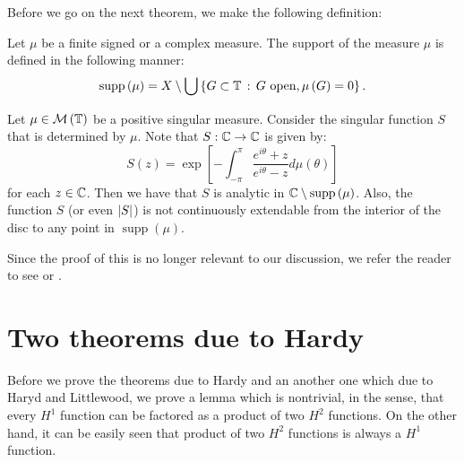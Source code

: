 Before we go on the next theorem, we make the following definition:
\begin{definition}
    Let $\mu$ be a finite signed or a complex measure. The support of the measure $\mu$ is defined in the following manner:
    \begin{equation*}
	\operatorname{supp} \left( \mu \right) = X \setminus \bigcup \left\{ G \subset \mathbb T \, : \, G \text{ open}, \mu \left( G \right) = 0 \right\}.
    \end{equation*}
    \label{def:support-of-a-measure}
\end{definition}

\begin{theorem}
    Let $\mu \in {\cal M} \left( \mathbb T \right)$ be a positive singular measure. Consider the singular function $S$ that is determined by $\mu$. Note that $S : \mathbb C \to \mathbb C$ is given by:
    \begin{equation*}
	S\left( z \right) = \exp \left[ -\int_{-\pi}^{\pi} \frac{e^{i\theta} + z}{e^{i\theta} - z} d\mu \left( \theta \right) \right]
    \end{equation*}
    for each $z\in \mathbb C$. Then we have that $S$ is analytic in $\mathbb C \setminus \operatorname{supp} \left( \mu \right)$. Also, the function $S$ (or even $\left\lvert S \right\rvert$) is not continuously extendable from the interior of the disc to any point in $\operatorname{supp} \left( \mu \right)$.
    \label{thm:analyticity-of-singular-functions}
\end{theorem}

Since the proof of this is no longer relevant to our discussion, we refer the reader to see \cite{garnett2007bounded} or \cite{hoffman2007banach}.


\section{Two theorems due to Hardy}
Before we prove the theorems due to Hardy and an another one which due to Haryd and Littlewood, we prove a lemma which is nontrivial, in the sense, that every $H^{1}$ function can be factored as a product of two $H^{2}$ functions. On the other hand, it can be easily seen that product of two $H^{2}$ functions is always a $H^{1}$ function.


